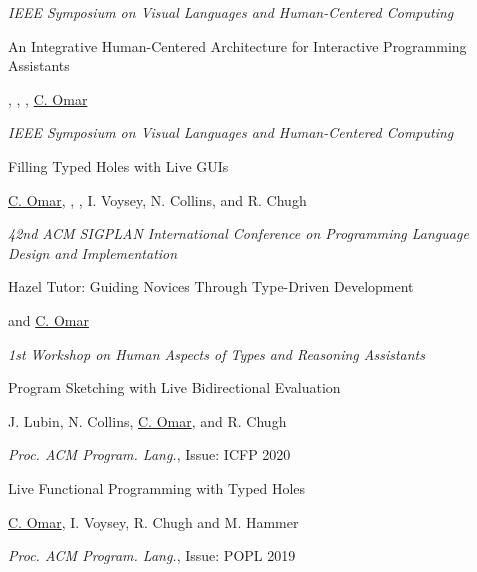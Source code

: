 \documentclass[10pt,letterpaper]{article}
\renewenvironment{itemize}{
  \begin{list}{}{
    \setlength{\leftmargin}{1.25em}
    \setlength{\itemsep}{0.25em}
    \setlength{\parskip}{0pt}
    \setlength{\parsep}{0.2em}
  }
}{
  \end{list}
}
\begin{document}
\begin{enumerate}[leftmargin=*, labelindent=6.5em, font=\bfseries]
\begin{itemize}
          \item \textit{IEEE Symposium on Visual Languages and Human-Centered Computing}
        \end{itemize}
  \item[VL/HCC 2022] {An Integrative Human-Centered Architecture for Interactive Programming Assistants}
        \begin{itemize}
          \item {}, , , \underline{C. Omar}
          \item \textit{IEEE Symposium on Visual Languages and Human-Centered Computing} 
        \end{itemize}
  \item[PLDI 2021] {Filling Typed Holes with Live GUIs}
        \begin{itemize}
          \item \underline{C. Omar}, , , I. Voysey, N. Collins, and R. Chugh
          \item \textit{42nd ACM SIGPLAN International Conference on Programming Language Design and Implementation}
        \end{itemize}
  \item[HATRA 2020] Hazel Tutor: Guiding Novices Through Type-Driven Development
        \begin{itemize}
          \item {} and \underline{C. Omar}
          \item \textit{1st Workshop on Human Aspects of Types and Reasoning Assistants}
        \end{itemize}
  \item[ICFP 2020] {Program Sketching with Live Bidirectional Evaluation}
        \begin{itemize}
          \item J. Lubin, N. Collins, \underline{C. Omar}, and R. Chugh
          \item \textit{Proc. ACM Program. Lang.}, Issue: ICFP 2020
        \end{itemize}
  \item[POPL 2019] {Live Functional Programming with Typed Holes}
        \begin{itemize}
          \item \underline{C. Omar}, I. Voysey, R. Chugh and M. Hammer
          \item \textit{Proc. ACM Program. Lang.}, Issue: POPL 2019
        \end{itemize}

\end{enumerate}
\end{document}
